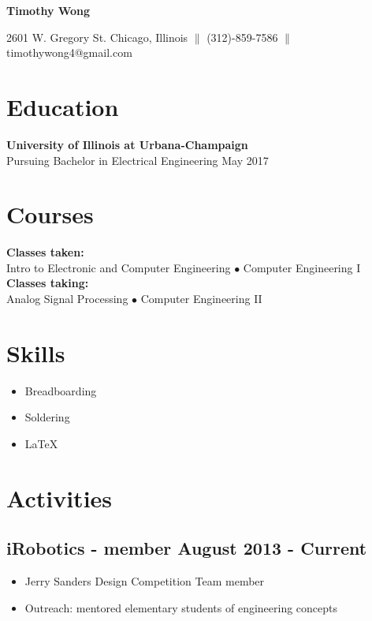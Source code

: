\documentclass[11pt]{article}
\begin{document}
	\begin{center}
		\begin{huge}
		\textbf{Timothy Wong}
		\end{huge}
		\noindent\makebox[\linewidth]{\rule{7in}{1pt}}

		2601 W. Gregory St. Chicago, Illinois $\|$ (312)-859-7586 $\|$ timothywong4@gmail.com
	\end{center}
	\section*{Education}
	\textbf{University of Illinois at Urbana-Champaign\\}
	Pursuing Bachelor in Electrical Engineering \hfill May 2017
	
	\section*{Courses}
	\textbf{Classes taken:}\\ Intro to Electronic and Computer Engineering $\bullet$ Computer Engineering I\\
	\textbf{Classes taking:}\\ Analog Signal Processing $\bullet$ Computer Engineering II
	
	\section*{Skills}
		\begin{itemize}
			\item Breadboarding
			\item Soldering
			\item \LaTeX
		\end{itemize}
		
	\section*{Activities}
	\subsection*{iRobotics - member \hfill August 2013 - Current}
	\begin{itemize}
		\item Jerry Sanders Design Competition Team member
		\item Outreach: mentored elementary students of engineering concepts
	\end{itemize}
	
\end{document}

